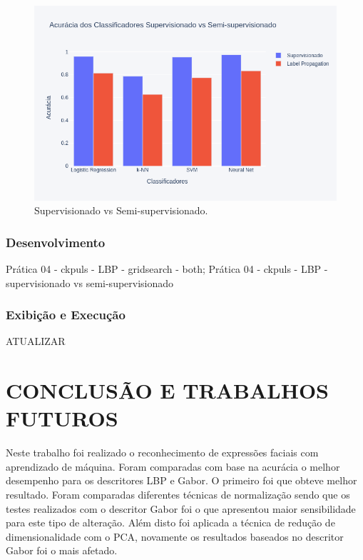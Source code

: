 \documentclass[a4paper, 12 pt, conference]{ieeeconf}  %
\begin{document}
\begin{figure}[!htbp]
	\centering
	\includegraphics[width=1.0\linewidth,clip=true,trim=0cm 0cm 0cm 0cm, keepaspectratio=true]{bar_supervisionado_vs_semi_lbp.png}
	\caption{Supervisionado vs Semi-supervisionado.}
	\label{fig:super_vs_semi_lbp}
\end{figure}

\subsubsection{Desenvolvimento} Prática 04 - ckpuls - LBP - gridsearch - both;
Prática 04 - ckpuls - LBP - supervisionado vs  semi-supervisionado
\subsubsection{Exibição e Execução} ATUALIZAR
\section{CONCLUSÃO E TRABALHOS FUTUROS}

Neste trabalho foi realizado o reconhecimento de expressões faciais com aprendizado de máquina. Foram comparadas com base na acurácia o melhor desempenho para os descritores LBP e Gabor. O primeiro foi que obteve melhor resultado. Foram comparadas diferentes técnicas de normalização sendo que os testes realizados com o descritor Gabor foi o que apresentou maior sensibilidade para este tipo de alteração. Além disto foi aplicada a técnica de redução de dimensionalidade com o PCA, novamente os resultados baseados no descritor Gabor foi o mais afetado.



\end{document}
